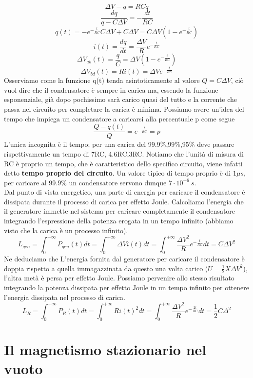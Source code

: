 \documentclass[
10pt, %
a4paper, %
oneside, %
headinclude,footinclude, %
BCOR5mm, %
]{scrartcl}
\begin{document}
\[\Delta V-q = RC \dot{q}\]
\[\frac{dq}{q-C\Delta V}= -\frac{dt}{RC}\]
\[q(t) = -e^{-\frac{t}{RC}}C\Delta V+C\Delta V = C\Delta V(1-e^{-\frac{t}{RC}})\]
\[i(t) = \frac{dq}{dt} = \frac{\Delta V}{R}e^{-\frac{t}{RC}}\]
\[\Delta V_{ab}(t)=\frac{q}{C}= \Delta V(1-e^{-\frac{t}{RC}})\]
\[\Delta V_{bd}(t)=Ri(t)= \Delta Ve^{-\frac{t}{RC}}\]
Osserviamo come la funzione q(t) tenda asintoticamente al valore \(Q=C\Delta V \), ciò vuol dire che il condensatore è sempre in carica ma, essendo la funzione esponenziale, già dopo pochissimo sarà carico quasi del tutto e la corrente che passa nel circuito per completare la carica è minima. Possiamo avere un'idea del tempo che impiega un condensatore a caricarsi alla percentuale p come segue
\[\frac{Q-q(t)}{Q} = e^{-\frac{t}{RC}}=p\]
L'unica incognita è il tempo; per una carica del 99.9\%,99\%,95\% deve passare rispettivamente un tempo di 7RC, 4.6RC,3RC. Notiamo che l'unità di misura di RC è proprio un tempo, che è caratteristico dello specifico circuito, viene infatti detto \textbf{tempo proprio del circuito}. Un valore tipico di tempo proprio è di \(1\mu s \), per caricare al 99.9\% un condensatore servono dunque \(7\cdot10^{-6}\ s\). \\
Dal punto di vista energetico, una parte di energia per caricare il condensatore è dissipata durante il processo di carica per effetto Joule. Calcoliamo l'energia che il generatore immette nel sistema per caricare completamente il condensatore integrando l'espressione della potenza erogata in un tempo infinito (abbiamo visto che la carica è un processo infinito). 
\[L_{gen} = \int_{0}^{+\infty}P_{gen}(t)dt=\int_{0}^{+\infty}\Delta V i(t)dt = \int_{0}^{+\infty}\frac{\Delta V^2}{R} e^{-\frac{t}{RC}}dt = C\Delta V^2 \]
Ne deduciamo che L'energia fornita dal generatore per caricare il condensatore è doppia rispetto a quella immagazzinata da questo una volta carico (\(U=\frac{1}{2}X\Delta V^2\)), l'altra metà è persa per effetto Joule. Possiamo pervenire allo stesso risultato integrando la potenza dissipata per effetto Joule in un tempo infinito per ottenere l'energia dissipata nel processo di carica. 
\[L_{R} = \int_{0}^{+\infty}P_{R}(t)dt =\int_{0}^{+\infty}Ri(t)^2dt = \int_{0}^{+\infty}\frac{\Delta V^2}{R}e^{-\frac{2t}{RC}}dt = \frac{1}{2}C\Delta^2\]
\section{Il magnetismo stazionario nel vuoto}
\end{document}
